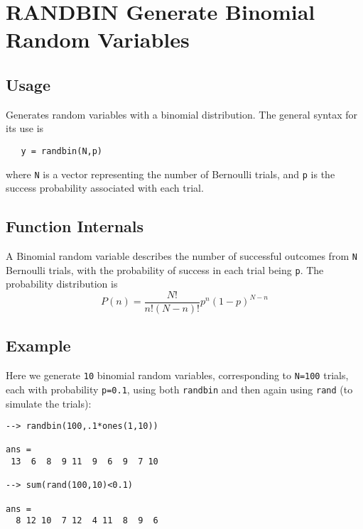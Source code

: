 \section{RANDBIN Generate Binomial Random Variables}

\subsection{Usage}

Generates random variables with a binomial distribution.
The general syntax for its use is
\begin{verbatim}
   y = randbin(N,p)
\end{verbatim}
where \verb|N| is a vector representing the number of Bernoulli
trials, and \verb|p| is the success probability associated with each
trial.
\subsection{Function Internals}

A Binomial random variable describes the number of successful
outcomes from \verb|N| Bernoulli trials, with the probability of
success in each trial being \verb|p|.  The probability distribution
is
\[
   P(n) = \frac{N!}{n!(N-n)!}p^n(1-p)^{N-n}
\]
\subsection{Example}

Here we generate \verb|10| binomial random variables, corresponding
to \verb|N=100| trials, each with probability \verb|p=0.1|, using
both \verb|randbin| and then again using \verb|rand| (to simulate the trials):
\begin{verbatim}
--> randbin(100,.1*ones(1,10))

ans = 
 13  6  8  9 11  9  6  9  7 10 

--> sum(rand(100,10)<0.1)

ans = 
  8 12 10  7 12  4 11  8  9  6 
\end{verbatim}
